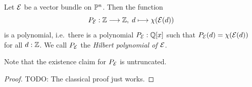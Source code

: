 %

\begin{proposition}
  Let $\mathcal{E}$ be a vector bundle on $\mathbb{P}^n$.
  Then the function
  \[
    P_{\mathcal{E}} :
    \mathbb Z \longrightarrow \mathbb Z, \;
    d \longmapsto \chi(\mathcal{E}(d))
  \]
  is a polynomial, i.e.\ there is a polynomial $P_{\mathcal{E}} : \mathbb Q[x]$ such that $P_{\mathcal{E}}(d) = \chi(\mathcal{E}(d))$ for all $d:\mathbb Z$.
  We call $P_{\mathcal{E}}$ the \emph{Hilbert polynomial of $\mathcal{E}$}.
\end{proposition}

Note that the existence claim for $P_{\mathcal{E}}$ is untruncated.

\begin{proof}
  {\color{red}TODO: The classical proof just works.}
\end{proof}
